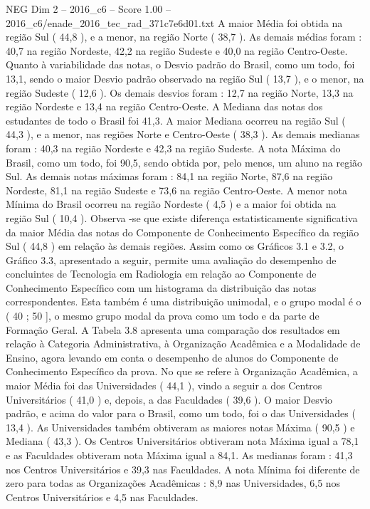 \begin{textsample}{NEG Dim 2 – 2016\_c6 – Score 1.00 – 2016\_c6/enade\_2016\_tec\_rad\_371c7e6d01.txt}
A maior Média foi obtida na região Sul ( 44,8 ), e a menor, na região Norte ( 38,7 ).
As demais médias foram : 40,7 na região Nordeste, 42,2 na região Sudeste e 40,0 na região Centro-Oeste.
Quanto à variabilidade das notas, o Desvio padrão do Brasil, como um todo, foi 13,1, sendo o maior Desvio padrão observado na região Sul ( 13,7 ), e o menor, na região Sudeste ( 12,6 ).
Os demais desvios foram : 12,7 na região Norte, 13,3 na região Nordeste e 13,4 na região Centro-Oeste.
A Mediana das notas dos estudantes de todo o Brasil foi 41,3.
A maior Mediana ocorreu na região Sul ( 44,3 ), e a menor, nas regiões Norte e Centro-Oeste ( 38,3 ).
As demais medianas foram : 40,3 na região Nordeste e 42,3 na região Sudeste.
A nota Máxima do Brasil, como um todo, foi 90,5, sendo obtida por, pelo menos, um aluno na região Sul.
As demais notas máximas foram : 84,1 na região Norte, 87,6 na região Nordeste, 81,1 na região Sudeste e 73,6 na região Centro-Oeste.
A menor nota Mínima do Brasil ocorreu na região Nordeste ( 4,5 ) e a maior foi obtida na região Sul ( 10,4 ).
Observa -se que existe diferença estatisticamente significativa da maior Média das notas do Componente de Conhecimento Específico da região Sul ( 44,8 ) em relação às demais regiões.
Assim como os Gráficos 3.1 e 3.2, o Gráfico 3.3, apresentado a seguir, permite uma avaliação do desempenho de concluintes de Tecnologia em Radiologia em relação ao Componente de Conhecimento Específico com um histograma da distribuição das notas correspondentes.
Esta também é uma distribuição unimodal, e o grupo modal é o ( 40 ; 50 ], o mesmo grupo modal da prova como um todo e da parte de Formação Geral.
A Tabela 3.8 apresenta uma comparação dos resultados em relação à Categoria Administrativa, à Organização Acadêmica e a Modalidade de Ensino, agora levando em conta o desempenho de alunos do Componente de Conhecimento Específico da prova.
No que se refere à Organização Acadêmica, a maior Média foi das Universidades ( 44,1 ), vindo a seguir a dos Centros Universitários ( 41,0 ) e, depois, a das Faculdades ( 39,6 ).
O maior Desvio padrão, e acima do valor para o Brasil, como um todo, foi o das Universidades ( 13,4 ).
As Universidades também obtiveram as maiores notas Máxima ( 90,5 ) e Mediana ( 43,3 ).
Os Centros Universitários obtiveram nota Máxima igual a 78,1 e as Faculdades obtiveram nota Máxima igual a 84,1.
As medianas foram : 41,3 nos Centros Universitários e 39,3 nas Faculdades.
A nota Mínima foi diferente de zero para todas as Organizações Acadêmicas : 8,9 nas Universidades, 6,5 nos Centros Universitários e 4,5 nas Faculdades.

\end{textsample}

